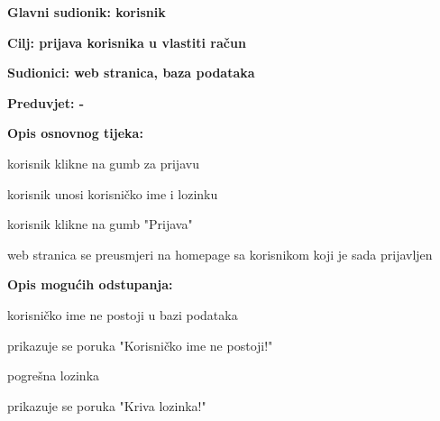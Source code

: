 				
					\noindent {}
					\begin{packed_item}
						\item \textbf{Glavni sudionik: korisnik}
						\item  \textbf{Cilj: prijava korisnika u vlastiti račun}
						\item  \textbf{Sudionici: web stranica, baza podataka}
						\item  \textbf{Preduvjet: -}
						
						\item  \textbf{Opis osnovnog tijeka:}
						\item[] \begin{packed_enum}
							\item korisnik klikne na gumb za prijavu
							\item korisnik unosi korisničko ime i lozinku
							\item korisnik klikne na gumb "Prijava"
							\item web stranica se preusmjeri na homepage sa korisnikom koji je sada prijavljen
						\end{packed_enum}
						
						\item  \textbf{Opis mogućih odstupanja:}
						\item[] \begin{packed_item}
							\item[2.a] korisničko ime ne postoji u bazi podataka
							\begin{packed_item}
								\item prikazuje se poruka "Korisničko ime ne postoji!"
							\end{packed_item}
							\item[2.b] pogrešna lozinka
							\begin{packed_item}
								\item prikazuje se poruka "Kriva lozinka!"
							\end{packed_item}
						\end{packed_item}
					\end{packed_item}


